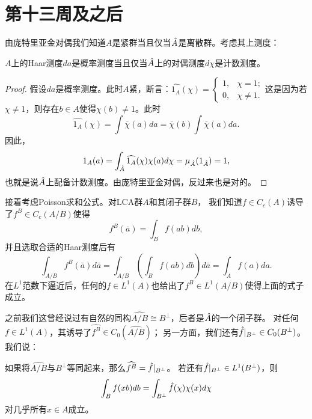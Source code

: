 \section{第十三周及之后}
由庞特里亚金对偶我们知道$A$是紧群当且仅当$\hat{A}$是离散群。考虑其上测度：
\begin{proposition}
    $A$上的Haar测度$da$是概率测度当且仅当$\hat{A}$上的对偶测度$d\chi$是计数测度。
\end{proposition}
\begin{proof}
    假设$da$是概率测度。此时$A$紧，断言：$\widehat{1_A}(\chi) = \begin{cases}
        1, & \chi = 1; \\ 0, & \chi \neq 1.
    \end{cases}$这是因为若$\chi \neq 1$，则存在$b \in A$使得$\chi(b) \neq 1$。此时
    \[\widehat{1_A}(\chi) = \int \overline{\chi}(a) da 
    = \overline{\chi}(b) \int \overline{\chi}(a) da.\]
    因此，\[1_A(a) = \int_{\hat{A}} \widehat{1_A}(\chi)\chi(a)d\chi = \mu_{\hat{A}}(1_{\hat{A}}) = 1,\]
    也就是说$\hat{A}$上配备计数测度。由庞特里亚金对偶，反过来也是对的。
\end{proof}

接着考虑Poisson求和公式。对LCA群$A$和其闭子群$B$，
我们知道$f \in C_c(A)$诱导了$f^B \in C_c(A/B)$使得
\[f^B(\bar{a}) = \int_B f(ab) db,\]
并且选取合适的Haar测度后有\[\int_{A/B} f^B(\bar{a})d\bar{a} 
= \int_{A/B}\left( \int_B f(ab)db \right) d\bar{a} = \int_A f(a) da.\]
在$L^1$范数下逼近后，任何的$f \in L^1(A)$也给出了$f^B \in L^1(A/B)$使得上面的式子成立。

之前我们这曾经说过有自然的同构$\widehat{A/B} \cong B^\bot$，后者是$\hat{A}$的一个闭子群。
对任何$f \in L^1(A)$，其诱导了$\widehat{f^B} \in C_0(\widehat{A/B})$；
另一方面，我们还有$\hat{f}|_{B^\bot} \in C_0(B^\bot)$。我们说：
\begin{theorem}[Poisson求和公式]
如果将$\widehat{A/B}$与$B^\bot$等同起来，那么$\widehat{f^B} = \hat{f}|_{B^\bot}$。
若还有$\hat{f}|_{B^\bot} \in L^1(B^\bot)$，则
\[\int_B f(xb)db = \int_{B^\bot} \hat{f}(\chi)\chi(x) d\chi\]对几乎所有$x \in A$成立。
\end{theorem}

